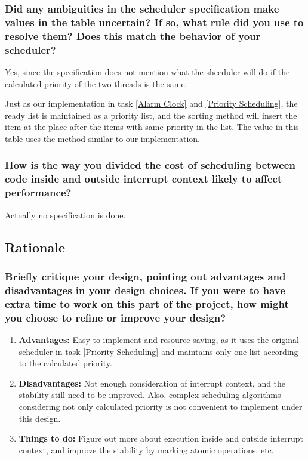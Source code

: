 \documentclass[sigconf, nonacm, balance=false, urlbreakonhyphens=true]{acmart}
\begin{document}
            \subsubsection{Did any ambiguities in the scheduler specification make values in the table uncertain? If so, what rule did you use to resolve them? Does this match the behavior of your scheduler? }

            Yes, since the specification does not mention what the shceduler will do if the calculated priority of the two threads is the same. 

            Just as our implementation in task \ref{Alarm Clock} and \ref{Priority Scheduling}, the ready list is maintained as a priority list, and the sorting method will insert the item at the place after the items with same priority in the list. The value in this table uses the method similar to our implementation. 

            \subsubsection{How is the way you divided the cost of scheduling between code inside and outside interrupt context likely to affect performance? }

            Actually no specification is done. 

        \subsection{Rationale}

            \subsubsection{Briefly critique your design, pointing out advantages and disadvantages in your design choices. If you were to have extra time to work on this part of the project, how might you choose to refine or improve your design? }

            \begin{enumerate}
                \item \textbf{Advantages:} Easy to implement and resource-saving, as it uses the original scheduler in task \ref{Priority Scheduling} and maintains only one list according to the calculated priority. 
                \item \textbf{Disadvantages:} Not enough consideration of interrupt context, and the stability still need to be improved. Also, complex scheduling algorithms considering not only calculated priority is not convenient to implement under this design. 
                \item \textbf{Things to do:} Figure out more about execution inside and outside interrupt context, and improve the stability by marking atomic operations, etc. 
            \end{enumerate}
\end{document}
